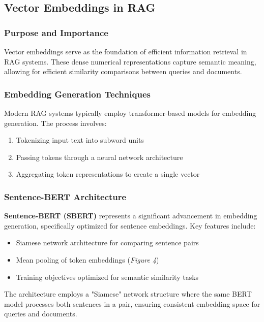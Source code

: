 \documentclass[12pt]{article}
\begin{document}
    \subsection{Vector Embeddings in RAG}
    \subsubsection{Purpose and Importance}
    Vector embeddings serve as the foundation of efficient information retrieval in RAG systems. 
    These dense numerical representations capture semantic meaning, allowing for
    efficient similarity comparisons between queries and documents.

    \subsubsection{Embedding Generation Techniques}
    Modern RAG systems typically employ transformer-based models for embedding generation. The process involves:
    \begin{enumerate}
    \item Tokenizing input text into subword units
    \item Passing tokens through a neural network architecture
    \item Aggregating token representations to create a single vector
    \end{enumerate}

    \newpage

    \subsubsection{Sentence-BERT Architecture}
    \textbf{Sentence-BERT (SBERT)} represents a significant advancement in embedding generation, 
    specifically optimized for sentence embeddings. Key features include:
    \begin{itemize}
    \item Siamese network architecture for comparing sentence pairs
    \item Mean pooling of token embeddings (\textit{Figure 4})
    \item Training objectives optimized for semantic similarity tasks
    \end{itemize}
    The architecture employs a "Siamese" network structure where the same BERT model processes both sentences in a pair, ensuring consistent embedding space for queries and documents.
\end{document}
